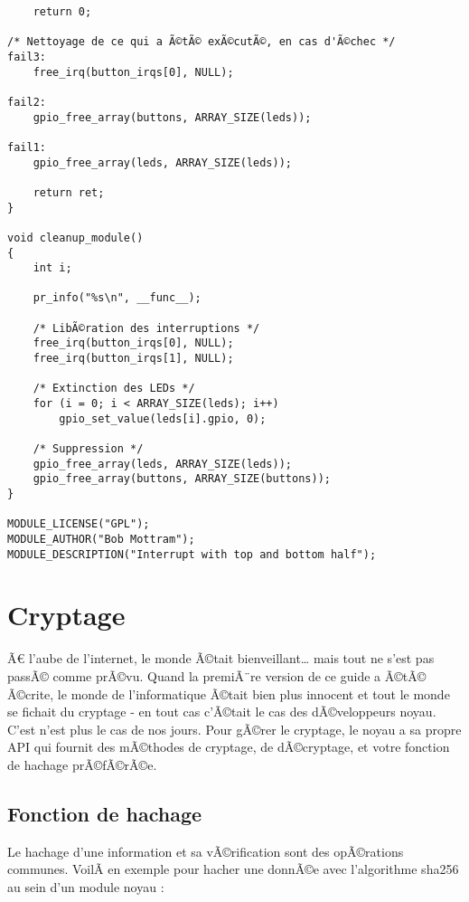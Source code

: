 \documentclass[11pt]{article}
\begin{document}
\begin{verbatim}
    return 0;

/* Nettoyage de ce qui a Ã©tÃ© exÃ©cutÃ©, en cas d'Ã©chec */
fail3:
    free_irq(button_irqs[0], NULL);

fail2:
    gpio_free_array(buttons, ARRAY_SIZE(leds));

fail1:
    gpio_free_array(leds, ARRAY_SIZE(leds));

    return ret;
}

void cleanup_module()
{
    int i;

    pr_info("%s\n", __func__);

    /* LibÃ©ration des interruptions */
    free_irq(button_irqs[0], NULL);
    free_irq(button_irqs[1], NULL);

    /* Extinction des LEDs */
    for (i = 0; i < ARRAY_SIZE(leds); i++)
        gpio_set_value(leds[i].gpio, 0);

    /* Suppression */
    gpio_free_array(leds, ARRAY_SIZE(leds));
    gpio_free_array(buttons, ARRAY_SIZE(buttons));
}

MODULE_LICENSE("GPL");
MODULE_AUTHOR("Bob Mottram");
MODULE_DESCRIPTION("Interrupt with top and bottom half");
\end{verbatim}

\section*{Cryptage}
\label{sec-16}

Ã€ l'aube de l'internet, le monde Ã©tait bienveillant\ldots{} mais tout ne s'est pas passÃ© comme prÃ©vu. Quand la premiÃ¨re version de ce guide a Ã©tÃ© Ã©crite, le monde de l'informatique Ã©tait bien plus innocent et tout le monde se fichait du cryptage - en tout cas c'Ã©tait le cas des dÃ©veloppeurs noyau. C'est n'est plus le cas de nos jours. Pour gÃ©rer le cryptage, le noyau a sa propre API qui fournit des mÃ©thodes de cryptage, de dÃ©cryptage, et votre fonction de hachage prÃ©fÃ©rÃ©e.

\subsection*{Fonction de hachage}
\label{sec-16-1}

Le hachage d'une information et sa vÃ©rification sont des opÃ©rations communes. VoilÃ  en exemple pour hacher une donnÃ©e avec l'algorithme sha256 au sein d'un module noyau :
\end{document}
